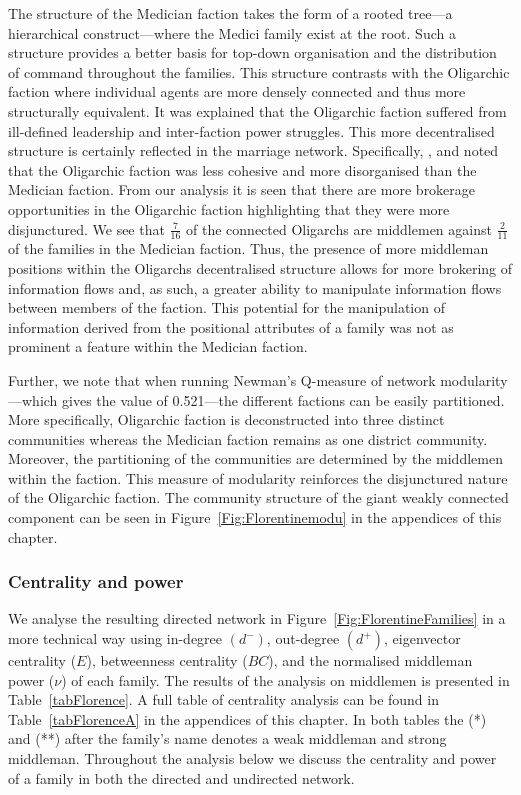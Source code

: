 The structure of the Medician faction takes the form of a rooted tree---a hierarchical construct---where the Medici family exist at the root. Such a structure provides a better basis for top-down organisation and the distribution of command throughout the families. This structure contrasts with the Oligarchic faction where individual agents are more densely connected and thus more structurally equivalent. It was explained that the Oligarchic faction suffered from ill-defined leadership and inter-faction power struggles. This more decentralised structure is certainly reflected in the marriage network. Specifically, \citet{Padgett1993}, \citet{PadgettMcLean2006} and \citet{PadgettPowell2012} noted that the Oligarchic faction was less cohesive and more disorganised than the Medician faction. From our analysis it is seen that there are more brokerage opportunities in the Oligarchic faction highlighting that they were more disjunctured. We see that $\tfrac{7}{16}$ of the connected Oligarchs are middlemen against $\tfrac{2}{11}$ of the families in the Medician faction. Thus, the presence of more middleman positions within the Oligarchs decentralised structure allows for more brokering of information flows and, as such, a greater ability to manipulate information flows between members of the faction. This potential for the manipulation of information derived from the positional attributes of a family was not as prominent a feature within the Medician faction.

Further, we note that when running Newman's Q-measure of network modularity \citep{Newman2004detecting, Newman2006}---which gives the value of 0.521---the different factions can be easily partitioned. More specifically, Oligarchic faction is deconstructed into three distinct communities whereas the Medician faction remains as one district community. Moreover, the partitioning of the communities are determined by the middlemen within the faction. This measure of modularity reinforces the disjunctured nature of the Oligarchic faction. The community structure of the giant weakly connected component can be seen in Figure~\ref{Fig:Florentinemodu} in the appendices of this chapter.

\subsubsection{Centrality and power}

We analyse the resulting directed network in Figure~\ref{Fig:FlorentineFamilies} in a more technical way using in-degree $\left(d^-\right)$, out-degree $\left(d^+\right)$, \citet{Bonacich1987} eigenvector centrality ($E$), betweenness centrality ($BC$), and the normalised middleman power ($\nu$) of each family. The results of the analysis on middlemen is presented in Table~\ref{tabFlorence}. A full table of centrality analysis can be found in Table~\ref{tabFlorenceA} in the appendices of this chapter. In both tables the (*) and (**) after the family's name denotes a weak middleman and strong middleman. Throughout the analysis below we discuss the centrality and power of a family in both the directed and undirected network.

